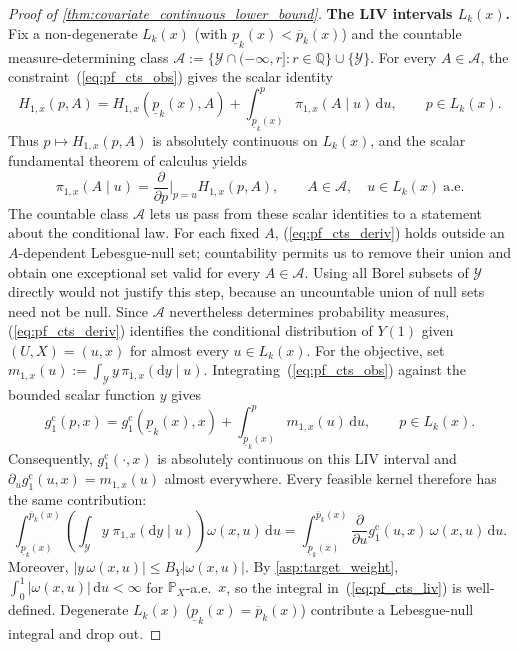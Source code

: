 \begin{proof}[Proof of \cref{thm:covariate_continuous_lower_bound}]
\medskip
\noindent\textbf{The LIV intervals $L_k(x)$.}
Fix a non-degenerate $L_k(x)$ (with $\underline{p}_k(x) < \overline{p}_k(x)$) and the countable measure-determining class $\mathcal A:=\{\mathcal Y\cap(-\infty,r]:r\in\mathbb Q\}\cup\{\mathcal Y\}$. For every $A\in\mathcal A$, the constraint~(\ref{eq:pf_cts_obs}) gives the scalar identity
\[
H_{1,x}(p,A)=H_{1,x}(\underline p_k(x),A)+\int_{\underline p_k(x)}^p\pi_{1,x}(A\mid u)\,\mathrm du,
\qquad p\in L_k(x).
\]
Thus $p\mapsto H_{1,x}(p,A)$ is absolutely continuous on $L_k(x)$, and the scalar fundamental theorem of calculus yields
\begin{equation}\label{eq:pf_cts_deriv}
    \pi_{1,x}(A \mid u) = \frac{\partial}{\partial p}\bigg|_{p=u} H_{1,x}(p,A),
    \qquad A\in\mathcal A,\quad u\in L_k(x)\ \text{a.e.}
\end{equation}
The countable class $\mathcal A$ lets us pass from these scalar identities to a statement about the conditional law. For each fixed $A$, (\ref{eq:pf_cts_deriv}) holds outside an $A$-dependent Lebesgue-null set; countability permits us to remove their union and obtain one exceptional set valid for every $A\in\mathcal A$. Using all Borel subsets of $\mathcal Y$ directly would not justify this step, because an uncountable union of null sets need not be null. Since $\mathcal A$ nevertheless determines probability measures, (\ref{eq:pf_cts_deriv}) identifies the conditional distribution of $Y(1)$ given $(U,X)=(u,x)$ for almost every $u\in L_k(x)$. For the objective, set $m_{1,x}(u):=\int_{\mathcal Y}y\,\pi_{1,x}(\mathrm dy\mid u)$. Integrating~(\ref{eq:pf_cts_obs}) against the bounded scalar function $y$ gives
\[
g_1^{\mathrm c}(p,x)=g_1^{\mathrm c}(\underline p_k(x),x)+\int_{\underline p_k(x)}^p m_{1,x}(u)\,\mathrm du,
\qquad p\in L_k(x).
\]
Consequently, $g_1^{\mathrm c}(\cdot,x)$ is absolutely continuous on this LIV interval and $\partial_u g_1^{\mathrm c}(u,x)=m_{1,x}(u)$ almost everywhere. Every feasible kernel therefore has the same contribution:
\begin{equation}\label{eq:pf_cts_liv}
    \int_{\underline{p}_k(x)}^{\overline{p}_k(x)} \left(\int_{\mathcal{Y}} y\;\pi_{1,x}(\mathrm{d}y \mid u)\right)\omega(x, u)\,\mathrm{d}u
    = \int_{\underline{p}_k(x)}^{\overline{p}_k(x)} \frac{\partial}{\partial u}g_1^{\mathrm c}(u,x)\,\omega(x, u)\,\mathrm{d}u.
\end{equation}
Moreover, $|y\,\omega(x,u)|\leqslant B_Y|\omega(x,u)|$. By \cref{asp:target_weight}, $\int_0^1|\omega(x,u)|\,\mathrm du<\infty$ for $\mathbb P_X$-a.e.\ $x$, so the integral in~(\ref{eq:pf_cts_liv}) is well-defined. Degenerate $L_k(x)$ ($\underline{p}_k(x) = \overline{p}_k(x)$) contribute a Lebesgue-null integral and drop out.


\end{proof}
